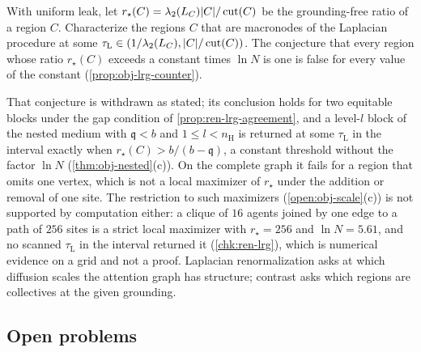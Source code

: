 \begin{openproblem}\label{conj:ren-lrg}
With uniform leak, let $r_\star(C)=\lambda_2(L_C)\lvert C\rvert/\operatorname{cut}(C)$ be the grounding-free ratio of a region $C$. Characterize the regions $C$ that are macronodes of the Laplacian procedure at some $\tau_{\mathrm L}\in(1/\lambda_2(L_C),\lvert C\rvert/\operatorname{cut}(C))$. The conjecture that every region whose ratio $r_\star(C)$ exceeds a constant times $\ln N$ is one is false for every value of the constant (\cref{prop:obj-lrg-counter}).
\end{openproblem}
That conjecture is withdrawn as stated; its conclusion holds for two equitable blocks under the gap condition of \cref{prop:ren-lrg-agreement}, and a level-$l$ block of the nested medium with $\mathfrak q<b$ and $1\le l<n_{\mathrm H}$ is returned at some $\tau_{\mathrm L}$ in the interval exactly when $r_\star(C)>b/(b-\mathfrak q)$, a constant threshold without the factor $\ln N$ (\cref{thm:obj-nested}(c)). On the complete graph it fails for a region that omits one vertex, which is not a local maximizer of $r_\star$ under the addition or removal of one site. The restriction to such maximizers (\cref{open:obj-scale}(c)) is not supported by computation either: a clique of $16$ agents joined by one edge to a path of $256$ sites is a strict local maximizer with $r_\star=256$ and $\ln N=5.61$, and no scanned $\tau_{\mathrm L}$ in the interval returned it (\cref{chk:ren-lrg}), which is numerical evidence on a grid and not a proof. Laplacian renormalization asks at which diffusion scales the attention graph has structure; contrast asks which regions are collectives at the given grounding.

\subsection{Open problems}\label{sup:ren-open-problems}

